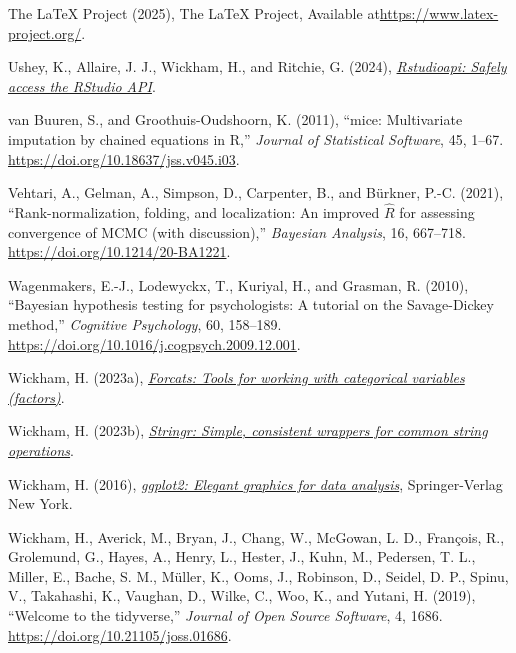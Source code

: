 \documentclass[
  10pt,
  a4paper,
  twoside]{article}
\newlength{\cslhangindent}
\newenvironment{CSLReferences}[2] %
 {\begin{list}{}{%
  \setlength{\itemindent}{0pt}
  \setlength{\leftmargin}{0pt}
  \setlength{\parsep}{0pt}
  \ifodd #1
   \setlength{\leftmargin}{\cslhangindent}
   \setlength{\itemindent}{-1\cslhangindent}
  \fi
  \setlength{\itemsep}{#2\baselineskip}}}
 {\end{list}}
\begin{document}
\begin{CSLReferences}{1}{0}
The LaTeX Project (2025), The LaTeX Project, Available at\url{https://www.latex-project.org/}.

Ushey, K., Allaire, J. J., Wickham, H., and Ritchie, G. (2024), \emph{\href{https://CRAN.R-project.org/package=rstudioapi}{Rstudioapi: Safely access the RStudio API}}.

van Buuren, S., and Groothuis-Oudshoorn, K. (2011), {``{mice}: Multivariate imputation by chained equations in {R},''} \emph{Journal of Statistical Software}, 45, 1--67. \url{https://doi.org/10.18637/jss.v045.i03}.

Vehtari, A., Gelman, A., Simpson, D., Carpenter, B., and Bürkner, P.-C. (2021), {``Rank-normalization, folding, and localization: An improved \(\hat{R}\) for assessing convergence of MCMC (with discussion),''} \emph{Bayesian Analysis}, 16, 667--718. \url{https://doi.org/10.1214/20-BA1221}.

Wagenmakers, E.-J., Lodewyckx, T., Kuriyal, H., and Grasman, R. (2010), {``Bayesian hypothesis testing for psychologists: A tutorial on the {Savage-Dickey} method,''} \emph{Cognitive Psychology}, 60, 158--189. \url{https://doi.org/10.1016/j.cogpsych.2009.12.001}.

Wickham, H. (2023a), \emph{\href{https://CRAN.R-project.org/package=forcats}{Forcats: Tools for working with categorical variables (factors)}}.

Wickham, H. (2023b), \emph{\href{https://CRAN.R-project.org/package=stringr}{Stringr: Simple, consistent wrappers for common string operations}}.

Wickham, H. (2016), \emph{\href{https://ggplot2.tidyverse.org}{ggplot2: Elegant graphics for data analysis}}, Springer-Verlag New York.

Wickham, H., Averick, M., Bryan, J., Chang, W., McGowan, L. D., François, R., Grolemund, G., Hayes, A., Henry, L., Hester, J., Kuhn, M., Pedersen, T. L., Miller, E., Bache, S. M., Müller, K., Ooms, J., Robinson, D., Seidel, D. P., Spinu, V., Takahashi, K., Vaughan, D., Wilke, C., Woo, K., and Yutani, H. (2019), {``Welcome to the {tidyverse},''} \emph{Journal of Open Source Software}, 4, 1686. \url{https://doi.org/10.21105/joss.01686}.


\end{CSLReferences}
\end{document}
